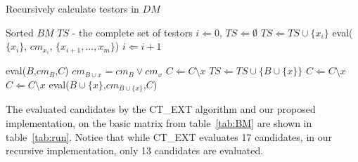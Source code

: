 \documentclass[citeauthoryear]{llncs}
\begin{document}
	\renewcommand{\algorithmicrequire}{\textbf{Input:}}
	\renewcommand{\algorithmicensure}{\textbf{Output:}}
	\begin{algorithm}
	\caption{Recursively calculate testors in $DM$}
	\label{alg1}
	\begin{multicols}{2}
	\begin{algorithmic}[1]
	  \REQUIRE Sorted $BM$
	  \ENSURE $TS$ - the complete set of testors
	  \STATE $i \Leftarrow 0$, $TS \Leftarrow \emptyset$
	  \label{line:firstrow}
	  	\label{line:singleT}
	  		\STATE $TS \Leftarrow TS\cup \lbrace x_i \rbrace$
	  	\ELSE
	  		\STATE eval($\lbrace x_i \rbrace$, $cm_{x_i}$, $\lbrace x_{i+1},..., x_m\rbrace$)\label{line:eval}
	  	\ENDIF
	  	\STATE $i \Leftarrow i+1$
	  \ENDWHILE
	  \item[] \item[] \item[] \item[] \item[]
	  \STATE eval($B$,$cm_B$,$C$)
	  	\STATE $cm_{B\cup x}=cm_B \vee cm_x$
	  	\label{line:contrib}
	  			\STATE $C \Leftarrow C\setminus x$\label{line:remT} 
	  			\STATE $TS \Leftarrow TS\cup\lbrace B\cup \lbrace x\rbrace \rbrace$
	  		\ENDIF
	  	\ELSE
	  		\STATE $C \Leftarrow C\setminus x$\label{line:remNoContrib} 
	  	\ENDIF
	  \ENDFOR
	  	\STATE $C \Leftarrow C\setminus x$
	  	\STATE eval($B\cup \lbrace x\rbrace$,$cm_{B\cup \lbrace x\rbrace}$,$C$)\label{line:recursive} 
	  \ENDFOR
	\end{algorithmic}
	\end{multicols}
	\end{algorithm}
	
	
	The evaluated candidates by the CT\_EXT algorithm and our proposed implementation, on the basic matrix from
	table~\ref{tab:BM} are shown in table~\ref{tab:run}. Notice that while CT\_EXT evaluates 17 candidates,
	in our recursive implementation, only 13 candidates are evaluated.
	
\end{document}
